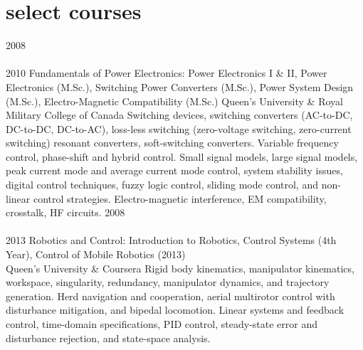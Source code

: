 
\section{select courses}

\begin{entrylist}
\entry
  {2008\\\faChevronDown\\2010}
  {Fundamentals of Power Electronics: Power Electronics I \& II, Power Electronics (M.Sc.), Switching Power Converters (M.Sc.), Power System Design (M.Sc.), Electro-Magnetic Compatibility (M.Sc.)}
  {Queen's University \& Royal Military College of Canada}
  {Switching devices, switching converters (AC-to-DC, DC-to-DC, DC-to-AC), 
  loss-less switching (zero-voltage switching, zero-current switching) resonant converters, soft-switching converters. 
  Variable frequency control, phase-shift and hybrid control. Small signal 
  models, large signal models, peak current mode and average current mode control, system stability issues, 
  digital control techniques, fuzzy logic control, sliding mode control, and non-linear control strategies. 
  Electro-magnetic interference, EM compatibility, crosstalk, HF circuits.}
\entry
  {2008\\\faChevronDown\\2013}
  {Robotics and Control: Introduction to Robotics, Control Systems (4th Year), Control of Mobile Robotics (2013)}
  {\\Queen's University \& Coursera}
  {Rigid body kinematics, manipulator kinematics, workspace, singularity, redundancy, 
  manipulator dynamics, and trajectory generation. Herd navigation and cooperation, aerial multirotor control with disturbance
  mitigation, and bipedal locomotion. Linear systems and feedback control, time-domain specifications, 
  PID control, steady-state error and disturbance rejection, and state-space analysis.}
\end{entrylist}